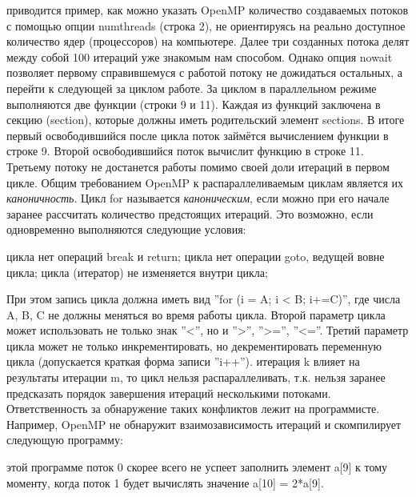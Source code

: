{	 приводится пример, как можно указать OpenMP количество создаваемых потоков с помощью опции num\textunderscore threads (строка 2), не ориентируясь на реально доступное количество ядер (процессоров) на компьютере. Далее три созданных потока делят между собой 100 итераций уже знакомым нам способом. Однако опция nowait позволяет первому справившемуся с работой потоку не дожидаться остальных, а перейти к следующей за циклом работе. За циклом в параллельном режиме выполняются две функции (строки 9 и 11). Каждая из функций заключена в секцию (section), которые должны иметь родительский элемент sections. В итоге первый освободившийся после цикла поток займётся вычислением функции в строке 9. Второй освободившийся поток вычислит функцию в строке 11. Третьему потоку не достанется работы помимо своей доли итераций в первом цикле.
Общим требованием OpenMP к распараллеливаемым циклам является их \textit{каноничность}. Цикл for называется \textit{каноническим}, если можно при его начале заранее рассчитать количество предстоящих итераций. Это возможно, если одновременно выполняются следующие условия:
	\begin{itemize}
		 цикла нет операций break и return;
		 цикла нет операции goto, ведущей вовне цикла;
		 цикла (итератор) не изменяется внутри цикла;
	\end{itemize}
	При этом запись цикла должна иметь вид ''for (i = A; i < B; i+=C)'', где числа A, B, C не должны меняться во время работы цикла. Второй параметр цикла может использовать не только знак ''<'', но и  ''>'',  ''>='',  ''<=''. Третий параметр цикла может не только инкрементировать, но декрементировать переменную цикла (допускается краткая форма записи ''i++'').
	 итерация k влияет на результаты итерации m, то цикл нельзя распараллеливать, т.к. нельзя заранее предсказать порядок завершения итераций несколькими потоками.  Ответственность за обнаружение таких конфликтов лежит на программисте. Например, OpenMP не обнаружит взаимозависимость итераций и скомпилирует следующую программу:
	\begin{figure}[H]
		
	\end{figure}
	 этой программе поток 0 скорее всего не успеет заполнить элемент a[9] к тому моменту, когда поток 1 будет вычислять значение a[10] = 2*a[9].
	\par
}